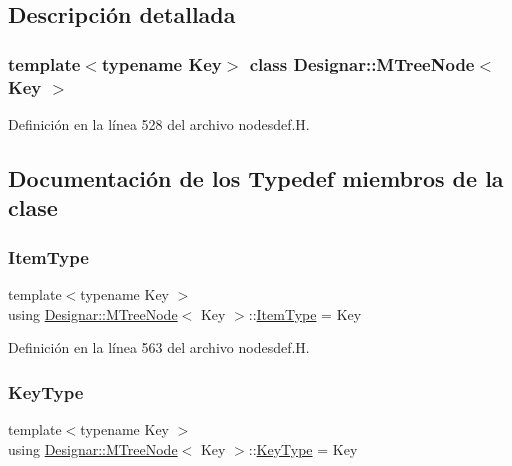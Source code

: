 \subsection{Descripción detallada}
\subsubsection*{template$<$typename Key$>$\newline
class Designar\+::\+M\+Tree\+Node$<$ Key $>$}



Definición en la línea 528 del archivo nodesdef.\+H.



\subsection{Documentación de los \textquotesingle{}Typedef\textquotesingle{} miembros de la clase}
\mbox{\label{class_designar_1_1_m_tree_node_aa649a0376eb81e3da0f4dcbd36871b4b}} 
\subsubsection{\texorpdfstring{Item\+Type}{ItemType}}
{\footnotesize\ttfamily template$<$typename Key $>$ \\
using \hyperlink{class_designar_1_1_m_tree_node}{Designar\+::\+M\+Tree\+Node}$<$ Key $>$\+::\hyperlink{class_designar_1_1_m_tree_node_aa649a0376eb81e3da0f4dcbd36871b4b}{Item\+Type} =  Key}



Definición en la línea 563 del archivo nodesdef.\+H.

\mbox{\label{class_designar_1_1_m_tree_node_ad45f6141e36722448b45aecde08761a0}} 
\subsubsection{\texorpdfstring{Key\+Type}{KeyType}}
{\footnotesize\ttfamily template$<$typename Key $>$ \\
using \hyperlink{class_designar_1_1_m_tree_node}{Designar\+::\+M\+Tree\+Node}$<$ Key $>$\+::\hyperlink{class_designar_1_1_m_tree_node_ad45f6141e36722448b45aecde08761a0}{Key\+Type} =  Key}



